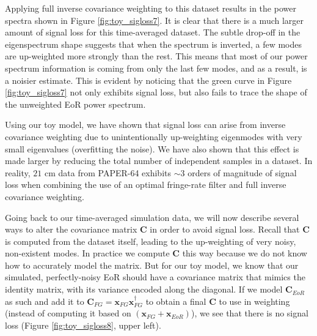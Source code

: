 \documentclass[preprint2,numberedappendix,tighten,twocolappendix]{aastex6}  %
\begin{document}
Applying full inverse covariance weighting to this dataset results in the power spectra shown in Figure \ref{fig:toy_sigloss7}. It is clear that there is a much larger amount of signal loss for this time-averaged dataset. The subtle drop-off in the eigenspectrum shape suggests that when the spectrum is inverted, a few modes are up-weighted more strongly than the rest. This means that most of our power spectrum information is coming from only the last few modes, and as a result, is a noisier estimate. This is evident by noticing that the green curve in Figure \ref{fig:toy_sigloss7} not only exhibits signal loss, but also fails to trace the shape of the unweighted EoR power spectrum.

Using our toy model, we have shown that signal loss can arise from inverse covariance weighting due to unintentionally up-weighting eigenmodes with very small eigenvalues (overfitting the noise). We have also shown that this effect is made larger by reducing the total number of independent samples in a dataset. In reality, $21$ cm data from PAPER-64 exhibits $\sim3$ orders of magnitude of signal loss when combining the use of an optimal fringe-rate filter and full inverse covariance weighting. 

Going back to our time-averaged simulation data, we will now describe several ways to alter the covariance matrix $\textbf{C}$ in order to avoid signal loss. Recall that $\textbf{C}$ is computed from the dataset itself, leading to the up-weighting of very noisy, non-existent modes. In practice we compute $\textbf{C}$ this way because we do not know how to accurately model the matrix. But for our toy model, we know that our simulated, perfectly-noisy EoR should have a covariance matrix that mimics the identity matrix, with its variance encoded along the diagonal. If we model $\textbf{C}_{EoR}$ as such and add it to $\textbf{C}_{FG} = \textbf{x}_{FG}\textbf{x}_{FG}^{\dagger}$ to obtain a final $\textbf{C}$ to use in weighting (instead of computing it based on $(\textbf{x}_{FG} + \textbf{x}_{EoR})$), we see that there is no signal loss (Figure \ref{fig:toy_sigloss8}, upper left).
\end{document}
